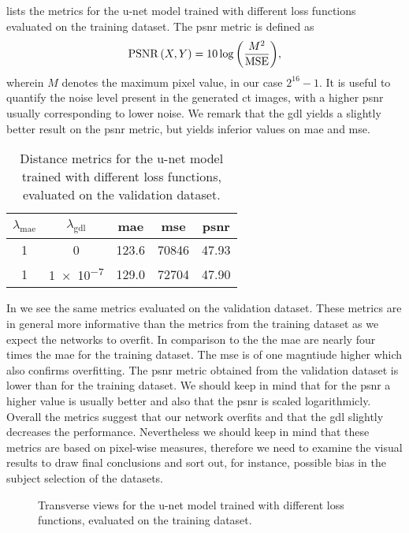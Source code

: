  lists the metrics for the u-net model trained with
different loss functions evaluated on the training dataset. The \gls{psnr}
metric is defined as
\begin{equation}
	\operatorname{PSNR}{\left(X,Y\right)}
	=
	10\log{\left(\frac{M^2}{\operatorname{MSE}}\right)}
	\label{eq:psnr},
\end{equation}
wherein $M$ denotes the maximum pixel value, in our case $2^{16}-1$. It is
useful to quantify the noise level present in the generated \gls{ct} images,
with a higher \gls{psnr} usually corresponding to lower noise. We remark
that the \gls{gdl} yields a slightly better result on the \gls{psnr} metric,
but yields inferior values on \gls{mae} and \gls{mse}.
\begin{table}[h]
  \centering
  \begin{tabular}{ccccc}
    \toprule
    $\lambda_\text{mae}$ &
    $\lambda_\text{gdl}$ &
    \acrshort{mae} &
    \acrshort{mse} &
    \acrshort{psnr} \\
    \midrule
    \num{1} & \num{0} & \num{123.6} & \num{70846} & \num{47.93} \\
    \num{1} & \num{1e-7} & \num{129.0} & \num{72704} & \num{47.90} \\
    \bottomrule
  \end{tabular}
  \caption{Distance metrics for the u-net model trained with different loss
    functions, evaluated on the validation dataset.
  }\label{tab:unet:validation}
\end{table}
In  we see the same metrics evaluated on the
validation dataset. These metrics are in general more informative than the
metrics from the training dataset as we expect the networks to overfit. In
comparison to the  the \gls{mae} are nearly four times
the \gls{mae} for the training dataset. The \gls{mse} is of one magntiude
higher which also confirms overfitting. The \gls{psnr} metric obtained from
the validation dataset is lower than for the training dataset. We should keep
in mind that for the \gls{psnr} a higher value is usually better and also that
the \gls{psnr} is scaled logarithmicly. Overall the metrics suggest that our
network overfits and that the \gls{gdl} slightly decreases the performance.
Nevertheless we should keep in mind that these metrics are based on
pixel-wise measures, therefore we need to examine the visual results to draw
final conclusions and sort out, for instance, possible bias in the subject
selection of the datasets.
\begin{figure}[h]
  \centering
  \begin{adjustbox}{width=\linewidth}
  \end{adjustbox}
  \caption{Transverse views for the u-net model trained with different
    loss functions, evaluated on the training dataset.
  }\label{fig:unet:training}
\end{figure}
